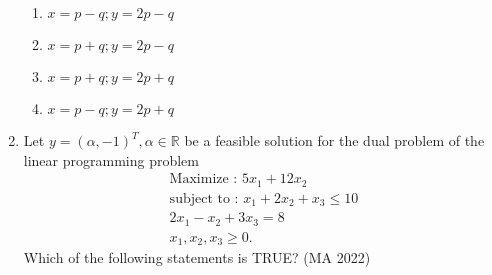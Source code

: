 \documentclass[journal,12pt,onecolumn]{IEEEtran}
\theoremstyle{remark}
\begin{document}
\begin{enumerate}
\begin{enumerate}
\item $x=p-q; y=2p-q$
\item $x=p+q; y=2p-q$
\item $x=p+q; y=2p+q$
\item $x=p-q; y=2p+q$
\end{enumerate}
\item Let $y = (\alpha,-1)^T , \alpha \in \mathbb{R}$ be a feasible solution for the dual problem of the linear
programming problem
\begin{align}
\text{Maximize : } 5x_1 + 12x_2 \\
\text{subject to : } x_1+2x_2+x_3 \leq 10 \\
2x_1-x_2+3x_3 = 8 \\
x_1,x_2,x_3 \geq 0.
\end{align}
Which of the following statements is TRUE?
\hfill{(MA 2022)}
\begin{multicols}{4}
\begin{enumerate}


\end{enumerate}
\end{multicols}
\end{enumerate}
\end{document}
